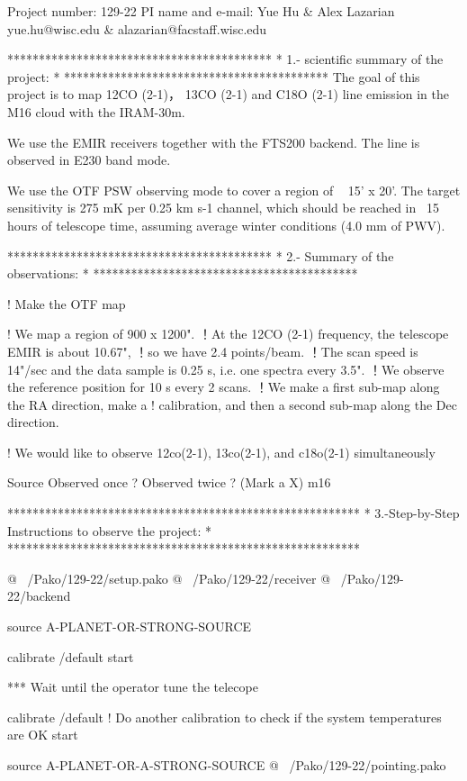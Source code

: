 Project number: 129-22
PI name and e-mail: Yue Hu \& Alex Lazarian
                    yue.hu@wisc.edu \& alazarian@facstaff.wisc.edu 

******************************************
* 1.- scientific summary of the project: *
******************************************
The goal of this project is to map 12CO (2-1)， 13CO (2-1) and C18O (2-1) line emission in the M16 cloud with the IRAM-30m.

We use the EMIR receivers together with the FTS200 backend. The line is observed in E230 band mode.

We use the OTF PSW observing mode to cover a region of ~ 15' x 20'. The target sensitivity is 275 mK per 0.25 km s-1 channel, which should be reached in ~15 hours of telescope time, assuming average winter conditions (4.0 mm of PWV).

******************************************
*    2.- Summary of the observations:    *
******************************************

! Make the OTF map

! We map a region of 900 x 1200". 
！At the 12CO (2-1) frequency, the telescope EMIR is about 10.67", 
！so we have 2.4 points/beam.  
！The scan speed is 14"/sec and the data sample is 0.25 s, i.e. one spectra every 3.5". 
！We observe the reference position for 10 s every 2 scans. 
！We make a first sub-map along the RA direction, make a
! calibration, and then a second sub-map along the Dec direction. 

! We would like to observe 12co(2-1), 13co(2-1), and c18o(2-1) simultaneously

Source      Observed once ?   Observed twice ? (Mark a X)
m16									


********************************************************
* 3.-Step-by-Step Instructions to observe the project: *
********************************************************

@ ~/Pako/129-22/setup.pako 
@ ~/Pako/129-22/receiver
@ ~/Pako/129-22/backend

source A-PLANET-OR-STRONG-SOURCE


calibrate /default
start


*** Wait until the operator tune the telecope



calibrate /default ! Do another calibration to check if the system temperatures are OK 
start


source A-PLANET-OR-A-STRONG-SOURCE
@ ~/Pako/129-22/pointing.pako
      
